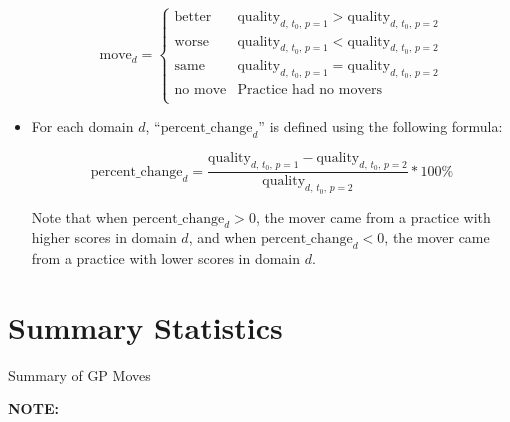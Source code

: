 \documentclass[11pt]{article}
\begin{document}
\begin{itemize}
$$
\textrm{move}_{d} = \begin{cases}
  \textrm{better} & \textrm{quality}_{d\textrm{, }t_0\textrm{, }p=1} > \textrm{quality}_{d\textrm{, }t_0\textrm{, }p=2} \\
  \textrm{worse}  & \textrm{quality}_{d\textrm{, }t_0\textrm{, }p=1} < \textrm{quality}_{d\textrm{, }t_0\textrm{, }p=2} \\
  \textrm{same}   & \textrm{quality}_{d\textrm{, }t_0\textrm{, }p=1} = \textrm{quality}_{d\textrm{, }t_0\textrm{, }p=2} \\
  \textrm{no move}   & \textrm{Practice had no movers} \\
  \end{cases}
$$



\item For each domain $d$, ``$\textrm{percent\_change}_{d}$'' is defined using the following formula:

$$
\textrm{percent\_change}_{d} = \frac{\textrm{quality}_{d\textrm{, }t_0\textrm{, }p=1} - \textrm{quality}_{d\textrm{, }t_0\textrm{, }p=2}}{\textrm{quality}_{d\textrm{, }t_0\textrm{, }p=2}} * 100\%
$$

Note that when $\textrm{percent\_change}_d > 0$, the mover came from a practice with higher scores in domain $d$, and when $\textrm{percent\_change}_d < 0$, the mover came from a practice with lower scores in domain $d$.


\end{itemize}


\section{Summary Statistics}


\begin{landscape}
\begin{table}[htp]
\caption{Summary of GP Moves}
  \begin{threeparttable}
  

  \begin{tablenotes}
  \footnotesize
  \textbf{NOTE:}
  \end{tablenotes}
  \end{threeparttable}
  \label{tab:allmovessummary}
\end{table}
\end{landscape}
\end{document}
